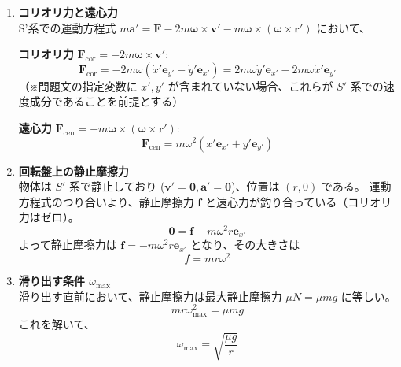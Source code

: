 \documentclass[a4paper,12pt]{jlreq}
\begin{document}
\begin{enumerate}[label=(\alph*)]
    \item \textbf{コリオリ力と遠心力} \\
    S'系での運動方程式 $m\bm{a}' = \bm{F} - 2m\bm{\omega}\times\bm{v}' - m\bm{\omega}\times(\bm{\omega}\times\bm{r}')$ において、
    
    \textbf{コリオリ力} $\bm{F}_{\text{cor}} = -2m\bm{\omega} \times \bm{v}'$:
    \[
    \bm{F}_{\text{cor}} = -2m\omega(\dot{x}'\bm{e}_{y'} - \dot{y}'\bm{e}_{x'}) = 2m\omega\dot{y}'\bm{e}_{x'} - 2m\omega\dot{x}'\bm{e}_{y'}
    \]
    （※問題文の指定変数に $\dot{x}', \dot{y}'$ が含まれていない場合、これらが $S'$ 系での速度成分であることを前提とする）

    \textbf{遠心力} $\bm{F}_{\text{cen}} = -m\bm{\omega}\times(\bm{\omega}\times\bm{r}')$:
    \[
    \bm{F}_{\text{cen}} = m\omega^2(x'\bm{e}_{x'} + y'\bm{e}_{y'})
    \]

    \item \textbf{回転盤上の静止摩擦力} \\
    物体は $S'$ 系で静止しており ($\bm{v}'=\bm{0}, \bm{a}'=\bm{0}$)、位置は $(r, 0)$ である。
    運動方程式のつり合いより、静止摩擦力 $\bm{f}$ と遠心力が釣り合っている（コリオリ力はゼロ）。
    \[
    \bm{0} = \bm{f} + m\omega^2 r \bm{e}_{x'}
    \]
    よって静止摩擦力は $\bm{f} = -m\omega^2 r \bm{e}_{x'}$ となり、その大きさは
    \[
    f = m r \omega^2
    \]

    \item \textbf{滑り出す条件 $\omega_{\max}$} \\
    滑り出す直前において、静止摩擦力は最大静止摩擦力 $\mu N = \mu mg$ に等しい。
    \[
    m r \omega_{\max}^2 = \mu m g
    \]
    これを解いて、
    \[
    \omega_{\max} = \sqrt{\frac{\mu g}{r}}
    \]
\end{enumerate}
\end{document}
